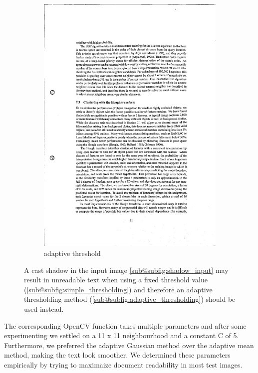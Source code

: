 \documentclass[bibliography=totoc]{scrartcl}
\begin{document}
\begin{figure}[ht!]
\begin{subfigure}[t]{0.28\linewidth}
		\includegraphics[width=\linewidth]{imgs/threshold/bad_lighting_adaptive.jpg}
		\caption{adaptive threshold}
		\label{subfig:adaptive_thresholding}
	\end{subfigure}
	\caption{A cast shadow in the input image \ref{sub@subfig:shadow_input} may result in unreadable text when using a fixed threshold value (\ref{sub@subfig:simple_thresholding}) and therefore an adaptive thresholding method  (\ref{sub@subfig:adaptive_thresholding}) should be used instead.}
	\label{fig:thresholding}
\end{figure}


The corresponding OpenCV function takes multiple parameters and after some experimenting we settled on a 11 x 11 neighbourhood and a constant C of 5.
Furthermore, we preferred the adaptive Gaussian method over the adaptive mean method, making the text look smoother.
We determined these parameters empirically by trying to maximaize document readability in most test images.
\end{document}
